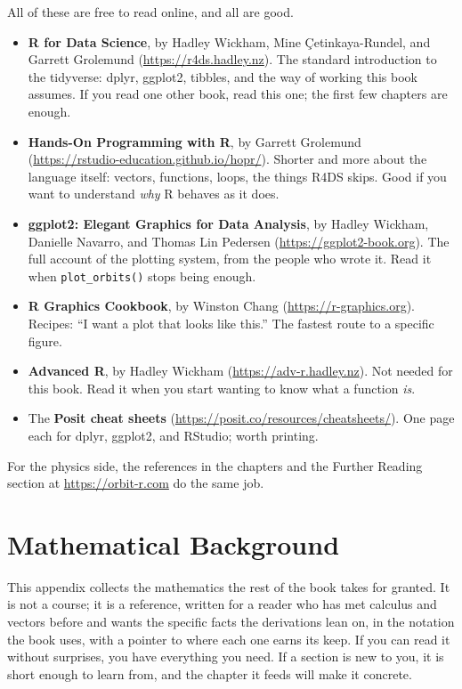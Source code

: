 \documentclass[
  10.5pt,
  letterpaper,
]{scrbook}
\providecommand{\tightlist}{%
  \setlength{\itemsep}{0pt}\setlength{\parskip}{0pt}}
\theoremstyle{definition}
\theoremstyle{plain}
\theoremstyle{remark}
\begin{document}
All of these are free to read online, and all are good.

\begin{itemize}
\tightlist
\item
  \textbf{R for Data Science}, by Hadley Wickham, Mine Çetinkaya-Rundel,
  and Garrett Grolemund (\url{https://r4ds.hadley.nz}). The standard
  introduction to the tidyverse: dplyr, ggplot2, tibbles, and the way of
  working this book assumes. If you read one other book, read this one;
  the first few chapters are enough.
\item
  \textbf{Hands-On Programming with R}, by Garrett Grolemund
  (\url{https://rstudio-education.github.io/hopr/}). Shorter and more
  about the language itself: vectors, functions, loops, the things R4DS
  skips. Good if you want to understand \emph{why} R behaves as it does.
\item
  \textbf{ggplot2: Elegant Graphics for Data Analysis}, by Hadley
  Wickham, Danielle Navarro, and Thomas Lin Pedersen
  (\url{https://ggplot2-book.org}). The full account of the plotting
  system, from the people who wrote it. Read it when
  \texttt{plot\_orbits()} stops being enough.
\item
  \textbf{R Graphics Cookbook}, by Winston Chang
  (\url{https://r-graphics.org}). Recipes: ``I want a plot that looks
  like this.'' The fastest route to a specific figure.
\item
  \textbf{Advanced R}, by Hadley Wickham
  (\url{https://adv-r.hadley.nz}). Not needed for this book. Read it
  when you start wanting to know what a function \emph{is}.
\item
  The \textbf{Posit cheat sheets}
  (\url{https://posit.co/resources/cheatsheets/}). One page each for
  dplyr, ggplot2, and RStudio; worth printing.
\end{itemize}

For the physics side, the references in the chapters and the Further
Reading section at \url{https://orbit-r.com} do the same job.

\chapter{Mathematical Background}\label{sec-math}

This appendix collects the mathematics the rest of the book takes for
granted. It is not a course; it is a reference, written for a reader who
has met calculus and vectors before and wants the specific facts the
derivations lean on, in the notation the book uses, with a pointer to
where each one earns its keep. If you can read it without surprises, you
have everything you need. If a section is new to you, it is short enough
to learn from, and the chapter it feeds will make it concrete.
\end{document}
